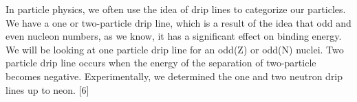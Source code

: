 In particle physics, we often use the idea of drip lines to categorize our particles.
We have a one or two-particle drip line, which is a result of the idea that odd and even nucleon numbers, as we know, it has a significant effect on binding energy.
We will be looking at one particle drip line for an odd(Z) or odd(N) nuclei.
Two particle drip line occurs when the energy of the separation of two-particle becomes negative.
Experimentally, we determined the one and two neutron drip lines up to neon. [6]
